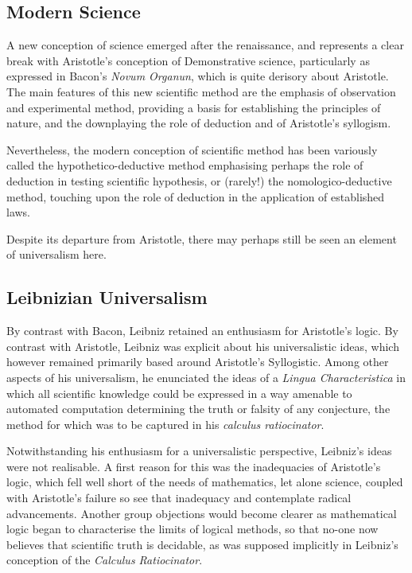\subsection{Modern Science}

A new conception of science emerged after the renaissance, and represents a clear break with Aristotle's conception of Demonstrative science, particularly as expressed in Bacon's \emph{Novum Organun}\cite{bacon2017novum}, which is quite derisory about Aristotle.
The main features of this new scientific method are the emphasis of observation and experimental method, providing a basis for establishing the principles of nature, and the downplaying the role of deduction and of Aristotle's syllogism.

Nevertheless, the modern conception of scientific method has been variously called the hypothetico-deductive method emphasising perhaps the role of deduction in testing scientific hypothesis, or (rarely!) the nomologico-deductive method, touching upon the role of deduction in the application of established laws.

Despite its departure from Aristotle, there may perhaps still be seen an element of universalism here.

\subsection{Leibnizian Universalism}

By contrast with Bacon, Leibniz retained an enthusiasm for Aristotle's logic.
By contrast with Aristotle, Leibniz was explicit about his universalistic ideas, which however remained primarily based around Aristotle's Syllogistic.
Among other aspects of his universalism, he enunciated the ideas of a \emph{Lingua Characteristica} in which all scientific knowledge could be expressed in a way amenable to automated computation determining the truth or falsity of any conjecture, the method for which was to be captured in his \emph{calculus ratiocinator}\cite{couturat1901logique,Peckhaus2004,Lenzen2018}.

Notwithstanding his enthusiasm for a universalistic perspective, Leibniz's ideas were not realisable.
A first reason for this was the inadequacies of Aristotle's logic, which fell well short of the needs of mathematics, let alone science, coupled with Aristotle's failure so see that inadequacy and contemplate radical advancements.
Another group objections would become clearer as mathematical logic began to characterise the limits of logical methods, so that no-one now believes that scientific truth is decidable, as was supposed implicitly in Leibniz's conception of the \emph{Calculus Ratiocinator}.

